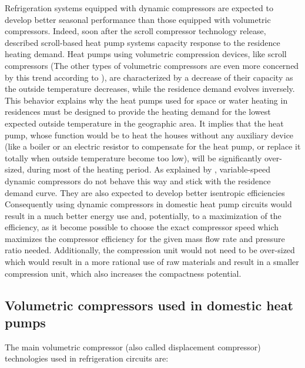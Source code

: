 Refrigeration systems equipped with dynamic compressors are expected
to develop better seasonal performance than those equipped with
volumetric compressors. Indeed, soon after the scroll compressor
technology release, \citet{Purvis-1987a} described scroll-based heat
pump systems capacity response to the residence heating demand. Heat
pumps using volumetric compression devices, like scroll compressors
(The other types of volumetric compressors are even more concerned by
this trend according to \citet{ASHRAE-HVACeq-2008a-Compressor}), are
characterized by a decrease of their capacity as the outside
temperature decreases, while the residence demand evolves
inversely. This behavior explains why the heat pumps used for space or
water heating in residences must be designed to provide the heating
demand for the lowest expected outside temperature in the geographic
area. It implies that the heat pump, whose function would be to heat
the houses without any auxiliary device (like a boiler or an electric
resistor to compensate for the heat pump, or replace it totally when
outside temperature become too low), will be significantly over-sized,
during most of the heating period. As explained by
\citet[p.\,1922]{Schiffmann-Favrat-2009a}, variable-speed dynamic
compressors do not behave this way and stick with the residence demand
curve. They are also expected to develop better isentropic
efficiencies  Consequently using
dynamic compressors in domestic heat pump circuits would result in a
much better energy use and, potentially, to a maximization of the
efficiency, as it become possible to choose the exact compressor speed
which maximizes the compressor efficiency for the given mass flow rate
and pressure ratio needed. Additionally, the compression unit would
not need to be over-sized which would result in a more rational use of
raw materials and result in a smaller compression unit, which also
increases the compactness potential.

\subsection{Volumetric compressors used in domestic
  heat pumps}
\label{sec:sota-vol-cp}

The main volumetric compressor (also called displacement compressor)
technologies used in refrigeration circuits are:

